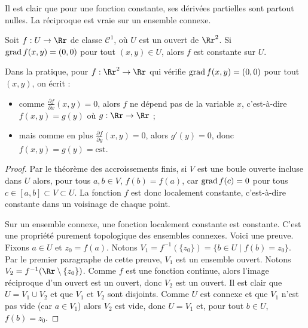 \documentclass[11pt, class=report,crop=false]{standalone}
\begin{document}
 
Il est clair que pour une fonction constante, ses dérivées partielles sont partout nulles. La réciproque est vraie sur un ensemble connexe.
 
\begin{corollaire}
Soit $f: U \rightarrow \Rr$ de classe $\mathcal{C}^1$, o\`u $U$ est un ouvert  de $\Rr^2$.
Si $\operatorname{grad} f (x,y) = (0,0)$ pour tout $(x,y) \in U$, alors $f$ est constante sur $U$.
\end{corollaire}


Dans la pratique, pour $f : \Rr^2 \to \Rr$ qui vérifie $\operatorname{grad} f (x,y) = (0,0)$ pour tout $(x,y)$, on écrit :
\begin{itemize}
  \item comme  $\frac{\partial f}{\partial x}(x,y) = 0$, alors $f$ ne dépend pas de la variable $x$, c'est-à-dire $f(x,y) = g(y)$ où $g : \Rr \to \Rr$ ;
  \item mais comme en plus $\frac{\partial f}{\partial y}(x,y) = 0$, alors $g'(y) = 0$, donc $f(x,y)= g(y) = \text{cst}$.
\end{itemize}


\begin{proof}
Par le théorème des accroissements finis, si $V$ est une boule ouverte incluse dans $U$ alors, pour tous $a,b \in V$, $f(b) = f(a)$, car $\operatorname{grad} f (c) = 0$ pour tous $c\in [a,b] \subset V \subset U$. La fonction $f$ est donc localement constante, c'est-à-dire constante dans un voisinage de chaque point.

Sur un ensemble connexe, une fonction localement constante est constante. C'est une propriété purement topologique des ensembles connexes. Voici une preuve.
Fixons $a \in U$ et $z_0 = f(a)$. Notons $V_1 = f^{-1}(\{z_0\}) = \{ b \in U \mid f(b)= z_0\}$. Par le premier paragraphe de cette preuve, $V_1$ est un ensemble ouvert. Notons $V_2 = f^{-1} ( \Rr \setminus \{z_0\} )$. Comme $f$ est une fonction continue, alors l'image réciproque d'un ouvert est un ouvert, donc $V_2$ est un ouvert. Il est clair que $U = V_1 \cup V_2$ et que $V_1$ et $V_2$ sont disjoints.
Comme $U$ est connexe et que $V_1$ n'est pas vide (car $a \in V_1$) alors $V_2$ est vide, donc $U=V_1$ et, pour tout $b\in U$, $f(b)= z_0$.
\end{proof}
\end{document}
